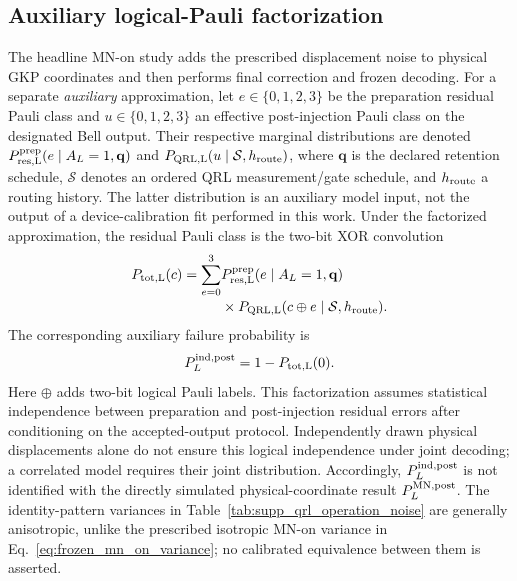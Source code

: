 \documentclass[aps,
prx,
superscriptaddress,
reprint,
longbibliography,
floatfix]{revtex4-2}
\begin{document}
\subsection{Auxiliary logical-Pauli factorization}
The headline MN-on study adds the prescribed displacement noise to physical GKP coordinates and then performs final correction and frozen decoding. For a separate \emph{auxiliary} approximation, let $e\in\{0,1,2,3\}$ be the preparation residual Pauli class and $u\in\{0,1,2,3\}$ an effective post-injection Pauli class on the designated Bell output. Their respective marginal distributions are denoted $P_{\rm res,L}^{\rm prep}(e\mid A_L=1,\mathbf q)$ and $P_{\rm QRL,L}(u\mid\mathcal S,h_{\rm route})$, where $\mathbf q$ is the declared retention schedule, $\mathcal S$ denotes an ordered QRL measurement/gate schedule, and $h_{\rm route}$ a routing history. The latter distribution is an auxiliary model input, not the output of a device-calibration fit performed in this work.
Under the factorized approximation, the residual Pauli class is the two-bit XOR convolution
\begin{align}
P_{\rm tot,L}(c)
=\sum_{e=0}^{3}&
P_{\rm res,L}^{\rm prep}(e\mid A_L=1,\mathbf q)
\nonumber\\[-2pt]
&\times P_{\rm QRL,L}(c\oplus e\mid\mathcal S,h_{\rm route}).
\label{eq:top_logical_use_convolution}
\end{align}
The corresponding auxiliary failure probability is
\begin{equation}
P_L^{\rm ind,post}=1-P_{\rm tot,L}(0).
\label{eq:independent_postinjection_error}
\end{equation}
Here $\oplus$ adds two-bit logical Pauli labels. This factorization assumes statistical independence between preparation and post-injection residual errors after conditioning on the accepted-output protocol. Independently drawn physical displacements alone do not ensure this logical independence under joint decoding; a correlated model requires their joint distribution. Accordingly, $P_L^{\rm ind,post}$ is not identified with the directly simulated physical-coordinate result $P_L^{\rm MN,post}$. The identity-pattern variances in Table~\ref{tab:supp_qrl_operation_noise} are generally anisotropic, unlike the prescribed isotropic MN-on variance in Eq.~\eqref{eq:frozen_mn_on_variance}; no calibrated equivalence between them is asserted.
\end{document}
